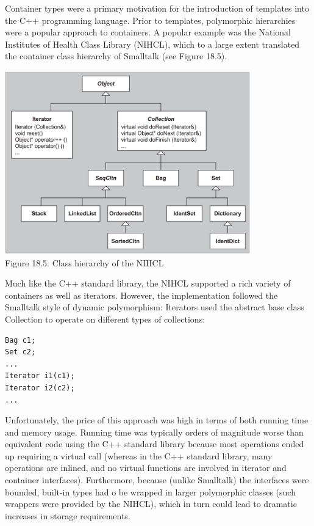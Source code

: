 Container types were a primary motivation for the introduction of templates into the C++ programming language. Prior to templates, polymorphic hierarchies were a popular approach to containers. A popular example was the National Institutes of Health Class Library (NIHCL), which to a large extent translated the container class hierarchy of Smalltalk (see Figure 18.5).

\begin{center}
\includegraphics[width=0.8\textwidth]{content/3/chapter18/images/5.png} \\
Figure 18.5. Class hierarchy of the NIHCL
\end{center}

Much like the C++ standard library, the NIHCL supported a rich variety of containers as well as iterators. However, the implementation followed the Smalltalk style of dynamic polymorphism: Iterators used the abstract base class Collection to operate on different types of collections:

\begin{lstlisting}[style=styleCXX]
Bag c1;
Set c2;
...
Iterator i1(c1);
Iterator i2(c2);
...
\end{lstlisting}

Unfortunately, the price of this approach was high in terms of both running time and memory usage. Running time was typically orders of magnitude worse than equivalent code using the C++ standard library because most operations ended up requiring a virtual call (whereas in the C++ standard library, many operations are inlined, and no virtual functions are involved in iterator and container interfaces). Furthermore, because (unlike Smalltalk) the interfaces were bounded, built-in types had o be wrapped in larger polymorphic classes (such wrappers were provided by the NIHCL), which in turn could lead to dramatic increases in storage requirements.


